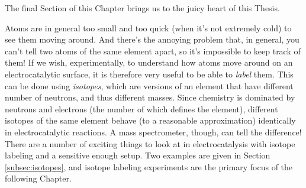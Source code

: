The final Section of this Chapter brings us to the juicy heart of this Thesis. 

Atoms are in general too small and too quick (when it's not extremely cold) to see them moving around. And there's the annoying problem that, in general, you can't tell two atoms of the same element apart, so it's impossible to keep track of them! If we wish, experimentally, to understand how atoms move around on an electrocatalytic surface, it is therefore very useful to be able to \textit{label} them. This can be done using \textit{isotopes}, which are versions of an element that have different number of neutrons, and thus different masses. Since chemistry is dominated by neutrons and electrons (the number of which defines the element), different isotopes of the same element behave (to a reasonable approximation) identically in electrocatalytic reactions. A mass spectrometer, though, can tell the difference! There are a number of exciting things to look at in electrocatalysis with isotope labeling and a sensitive enough setup. Two examples are given in Section \ref{subsec:isotopes}, and isotope labeling experiments are the primary focus of the following Chapter.

